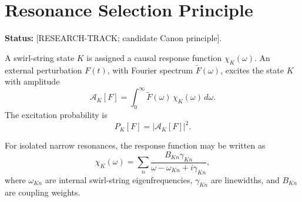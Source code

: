 
\providecommand{\vswirl}{\mathbf{v}_{\!\boldsymbol{\circlearrowleft}}}
\providecommand{\vnorm}{\lVert \mathbf{v}_{\!\boldsymbol{\circlearrowleft}}\rVert}
\providecommand{\rhoF}{\rho_{\!f}}
\providecommand{\rhoE}{\rho_{\!E}}
\providecommand{\rhoM}{\rho_{\!m}}
\providecommand{\rhocore}{\rho_{\text{core}}}
\providecommand{\rc}{r_c}
\providecommand{\omC}{\omega_C}
\providecommand{\Fswirlmax}{F_{\text{swirl}}^{\max}}



\section{Resonance Selection Principle}
    \label{sec:resonance-selection-principle}
    
    \noindent
    \textbf{Status:} [RESEARCH-TRACK; candidate Canon principle].
    
    A swirl-string state \(K\) is assigned a causal response function
    \(\chi_K(\omega)\). An external perturbation \(F(t)\), with Fourier
    spectrum \(\widetilde F(\omega)\), excites the state \(K\) with amplitude
    \begin{equation}
        \mathcal A_K[F]
        =
        \int_0^\infty
        \widetilde F(\omega)\,
        \chi_K(\omega)\,
        d\omega .
    \end{equation}
    The excitation probability is
    \begin{equation}
        P_K[F]
        =
        |\mathcal A_K[F]|^2 .
    \end{equation}
    
    For isolated narrow resonances, the response function may be written as
    \begin{equation}
        \chi_K(\omega)
        =
        \sum_n
        \frac{B_{Kn}\gamma_{Kn}}
        {\omega-\omega_{Kn}+i\gamma_{Kn}},
    \end{equation}
    where \(\omega_{Kn}\) are internal swirl-string eigenfrequencies,
    \(\gamma_{Kn}\) are linewidths, and \(B_{Kn}\) are coupling weights.
    

